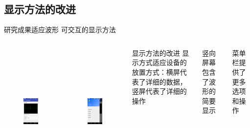 \documentclass[aspectratio=43,fleqn]{beamer}
\begin{document}
\subsection{显示方法的改进}
\begin{frame}{研究成果}{适应波形 可交互的显示方法}
	\begin{columns}
			{\begin{figure}[ht]
			\begin{center}
				\includegraphics[height=6.8cm]{fig1.png}
			\end{center}
			\end{figure}}
			{\begin{figure}[ht]
			\begin{center}
				\includegraphics[height=6.8cm]{fig2.png}
			\end{center}
			\end{figure}}
			\begin{block}{显示方法的改进}
				显示方式适应设备的放置方式：横屏代表了详细的数据，竖屏代表了详细的操作
			\end{block}
			{\begin{block}{}
				竖向屏幕包含了波形的简要显示
			\end{block}}
			{\begin{block}{}
				菜单栏提供了更多选项和操作
			\end{block}}
	\end{columns}
\end{frame}
\end{document}
